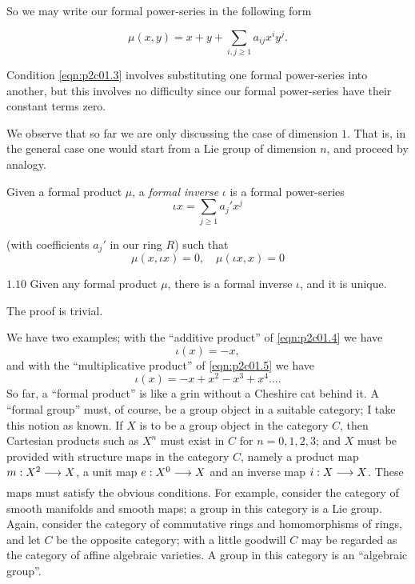 \documentclass[../main]{subfiles}
\begin{document}
So we may write our formal power-series in the following form 

\begin{equation}
\tag{1.7}
\label{eqn:p2c01.7}
\mu(x, y) = x + y + \sum_{i, j \ge 1} a_{ij} x^i y^j.
\end{equation}

Condition \eqref{eqn:p2c01.3} involves substituting one formal power-series into another, but this involves no difficulty since our formal power-series have their constant terms zero.

We observe that so far we are only discussing the case of dimension $1$. That is, in the general case one would start from a Lie group of dimension $n$, and proceed by analogy.

Given a formal product $\mu$, a \emph{formal inverse} $\iota$ is a formal power-series
\begin{equation}
\tag{1.8}
\label{eqn:p2c01.8}
\iota x = \sum_{j \ge 1} a_j' x^j
\end{equation}

(with coefficients $a_j'$ in our ring $R$) such that 
\begin{equation}
\tag{1.9}
\label{eqn:p2c01.9}
\mu(x, \iota x) = 0, \quad \mu(\iota x, x) = 0
\end{equation}

\begin{customlemma}{$1.10$}
\label{lem:p2c01.10}
Given any formal product $\mu$, there is a formal inverse $\iota$, and it is unique.
\end{customlemma}

The proof is trivial. 

We have two examples; with the ``additive product'' of \eqref{eqn:p2c01.4} we have \[\iota(x) = -x,\] and with the ``multiplicative product'' of \eqref{eqn:p2c01.5} we have \[\iota(x) = -x + x^2 - x^3 + x^4 \ldots.\] So far, a ``formal product'' is like a grin without a Cheshire cat behind it. A ``formal group'' must, of course, be a group object in a suitable category; I take this notion as known. If $X$ is to be a group object in the category $C$, then Cartesian products such as $X^n$ must exist in $C$ for $n = 0, 1, 2, 3$; and $X$ must be provided with structure maps in the category $C$, namely a product map $m : X^2 \lar{} X$, a unit map $e : X^0 \lar{} X$ and an inverse map $i : X \lar{} X$. These maps must satisfy the obvious conditions. For example, consider the category of smooth manifolds and smooth maps; a group in this category is a Lie group. Again, consider the category of commutative rings and homomorphisms of rings, and let $C$ be the opposite category; with a little goodwill $C$ may be regarded as the category of affine algebraic varieties. A group in this category is an ``algebraic group''.\\
\end{document}
